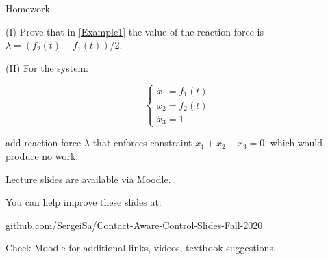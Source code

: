 \documentclass{beamer}
\begin{document}
\begin{frame}{Homework}
\begin{flushleft}

(I) Prove that in \eqref{Example1} the value of the reaction force is $\lambda = (f_2 (t) - f_1 (t)) / 2$.

\bigskip

(II) For the system:

\begin{equation}
\begin{cases}
    \ddot x_1 = f_1 (t) \\
    \ddot x_2 = f_2 (t) \\
    \ddot x_3 = 1
\end{cases}
\end{equation}

add reaction force $\lambda$ that enforces constraint $\ddot x_1 + \ddot x_2 - \ddot x_3 = 0$, which would produce no work.

\end{flushleft}
\end{frame}




\begin{frame}
\centerline{Lecture slides are available via Moodle.}
\bigskip
\centerline{You can help improve these slides at:}
\centerline{\href{https://github.com/SergeiSa/Contact-Aware-Control-Slides-Fall-2020}{github.com/SergeiSa/Contact-Aware-Control-Slides-Fall-2020}}
\bigskip
\centerline{Check Moodle for additional links, videos, textbook suggestions.}
\end{frame}
\end{document}
